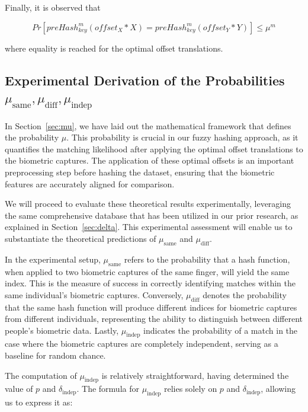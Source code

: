 Finally, it is observed that

\begin{equation}
    Pr[preHash_{key}^m(offset_X * X) = preHash_{key}^m(offset_Y * Y)] \leq \mu^m
\end{equation}

where equality is reached for the optimal offset translations.

\subsection{Experimental Derivation of the Probabilities \(\mu_{\text{same}}, \mu_{\text{diff}}, \mu_{\text{indep}}\)}

In Section~\ref{sec:mu}, we have laid out the mathematical framework that defines the probability \(\mu\). This probability is crucial in our fuzzy hashing approach, as it quantifies the matching likelihood after applying the optimal offset translations to the biometric captures. The application of these optimal offsets is an important preprocessing step before hashing the dataset, ensuring that the biometric features are accurately aligned for comparison.

We will proceed to evaluate these theoretical results experimentally, leveraging the same comprehensive database that has been utilized in our prior research, as explained in Section~\ref{sec:delta}. This experimental assessment will enable us to substantiate the theoretical predictions of \(\mu_{\text{same}}\) and \(\mu_{\text{diff}}\).

In the experimental setup, \(\mu_{\text{same}}\) refers to the probability that a hash function, when applied to two biometric captures of the same finger, will yield the same index. This is the measure of success in correctly identifying matches within the same individual's biometric captures. Conversely, \(\mu_{\text{diff}}\) denotes the probability that the same hash function will produce different indices for biometric captures from different individuals, representing the ability to distinguish between different people's biometric data. Lastly, \(\mu_{\text{indep}}\) indicates the probability of a match in the case where the biometric captures are completely independent, serving as a baseline for random chance.

The computation of \( \mu_{\text{indep}} \) is relatively straightforward, having determined the value of \( p \) and \(\delta_{\text{indep}}\). The formula for \( \mu_{\text{indep}} \) relies solely on \( p \) and \(\delta_{\text{indep}}\), allowing us to express it as:

